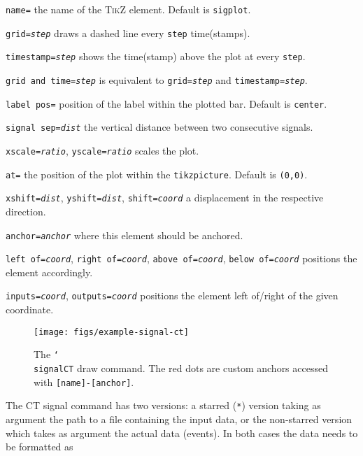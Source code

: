 \begin{optionslist}
\item \texttt{name=} the name of the \textsc{TikZ} element. Default is \texttt{sigplot}.
\item \texttt{grid=\it step} draws a dashed line every \texttt{step} time(stamps).
\item \texttt{timestamp=\it step} shows the time(stamp) above the plot at every \texttt{step}.
\item \texttt{grid and time=\it step} is equivalent to \texttt{grid=\it step} and \texttt{timestamp=\it step}.
\item \texttt{label pos=} position of the label within the plotted bar. Default is \texttt{center}.
\item \texttt{signal sep=\it dist} the vertical distance between two consecutive signals.
\item \texttt{xscale=\it ratio}, \texttt{yscale=\it ratio} scales the plot.
\item \texttt{at=} the position of the plot within the \texttt{tikzpicture}. Default is \texttt{(0,0)}.
\item \texttt{xshift=\it dist}, \texttt{yshift=\it dist}, \texttt{shift=\it coord} a displacement in the respective direction.
\item \texttt{anchor=\it anchor} where this element should be anchored.
\item \texttt{left of=\it coord}, \texttt{right of=\it coord}, \texttt{above of=\it coord}, \texttt{below of=\it coord} positions the element accordingly.
\item \texttt{inputs=\it coord}, \texttt{outputs=\it coord} positions the element left of/right of the given coordinate.
\end{optionslist}

\begin{figure}[htb]\centering
\texttt{[image: figs/example-signal-ct]}

\caption{The \texttt{\char`\\signalCT} draw command. The red dots are custom anchors accessed with \texttt{[name]-[anchor]}.}
\end{figure}
\hspace{1pt}

\noindent The CT signal command has two versions: a starred (\texttt{*}) version taking as argument the path to a file containing the input data, or the non-starred version which takes as argument the actual data (events). In both cases the data needs to be formatted as

